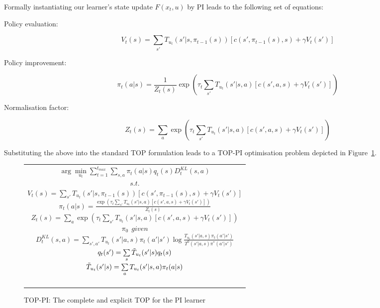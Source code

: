 Formally instantiating our learner's state update $F(x_t,u)$ by PI
leads to the following set of equations: %
\begin{description}
\item[Policy evaluation:]
  \[V_t(s)=\sum\limits_{s'}T_{u_t}(s'|s,\pi_{t-1}(s))\left[
    c(s',\pi_{t-1}(s),s)+\gamma V_t(s')
    \right]\]

\item[Policy improvement:]
\[\pi_t(a|s)=\frac{1}{Z_t(s)}\exp\left(\tau_t\sum\limits_{s'}T_{u_t}(s'|s,a)\left[
    c(s',a,s)+\gamma V_t(s')
    \right]\right) \]
    
\item[Normalisation factor:]
\[Z_t(s)=\sum\limits_a\exp\left(\tau_t\sum\limits_{s'}T_{u_t}(s'|s,a)\left[
    c(s',a,s)+\gamma V_t(s') \right]\right)\]
\end{description}
    

Substituting the above into the standard
TOP formulation leads to a TOP-PI optimisation problem depicted in
Figure~\ref{t_opt_PI}.
\begin{figure}[th]
\begin{tabular}{|c|} \hline \parbox{3.2 in} {\center 
$\arg\min\limits_{u_t}\sum\limits_{t=1}^{t_{max}}\sum\limits_{s,a}\pi_t(a|s)q_t(s)D^{KL}_t(s,a)$\\
$s.t.$\\
$V_t(s)=\sum\limits_{s'}T_{u_t}(s'|s,\pi_{t-1}(s))\left[
c(s',\pi_{t-1}(s),s)+\gamma V_t(s')
\right]$\\
$\pi_t(a|s)=\frac{\exp\left(\tau_t\sum\limits_{s'}T_{u_t}(s'|s,a)\left[
c(s',a,s)+\gamma V_t(s')
\right]\right)}{Z_t(s)}$\\
$Z_t(s)=\sum\limits_a\exp\left(\tau_t\sum\limits_{s'}T_{u_t}(s'|s,a)\left[
c(s',a,s)+\gamma V_t(s')
\right]\right)$\\
$\pi_0\ \ \displaystyle{given}$\\
$D^{KL}_t(s,a)=\sum\limits_{s',a'}T_{u_t}(s'|a,s)\pi_t(a'|s')\log\frac{T_{u_t}(s'|a,s)\pi_t(a'|s')}{T^0(s'|a,s)\pi^*(a'|s')}$\\
$q_t(s')=\sum\limits_s\Tilde{T}_{u_t}(s'|s)q_t(s)$\\
$\Tilde{T}_{u_t}(s'|s)=\sum\limits_aT_{u_t}(s'|s,a)\pi_t(a|s)$\\\ \\
}\\ \hline \end{tabular}
\caption{\label{t_opt_PI}TOP-PI: The complete and explicit TOP for the
  PI learner}
\end{figure}
